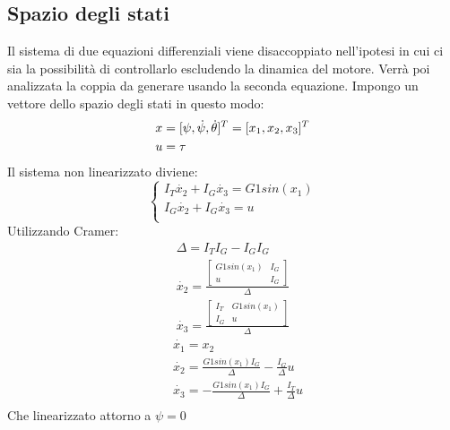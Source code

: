\documentclass{article}
\begin{document}
\subsection{Spazio degli stati}
Il sistema di due equazioni differenziali viene disaccoppiato nell'ipotesi in cui ci sia la possibilità di controllarlo escludendo la dinamica del motore. Verrà poi analizzata la coppia da generare usando la seconda equazione.
Impongo un vettore dello spazio degli stati in questo modo:
\begin{align*}
&x = [\psi,\dot\psi,\dot\theta]^T \notag =[x_1,x_2,x_3]^T \notag\\ 
&u = \tau
\end{align*}
Il sistema non linearizzato diviene:
\[
\begin{cases}
I_T\dot{x_2}+I_G\dot{x_3} = G1sin(x_1)\\
I_G\dot{x_2}+I_G\dot{x_3} = u\\
\end{cases}
\]
Utilizzando Cramer:
\begin{gather}
\Delta = I_T I_G - I_G I_G\\
\dot{x_2} = \frac{\begin{bmatrix}
G1sin(x_1) & I_G\\
u & I_G
\end{bmatrix}}
{\Delta}\\
\dot{x_3} = \frac{\begin{bmatrix}
I_T &  G1sin(x_1)\\
I_G &  u
\end{bmatrix}}
{\Delta}
\end{gather}
\begin{align*}
&\dot{x_1} = x_2\\
&\dot{x_2} = \frac{G1sin(x_1)I_G}{\Delta} -\frac{I_G}{\Delta}u\\
&\dot{x_3} = -\frac{G1sin(x_1)I_G}{\Delta} +\frac{I_T}{\Delta}u\\
\end{align*}
Che linearizzato attorno a $\psi = 0$
\end{document}
